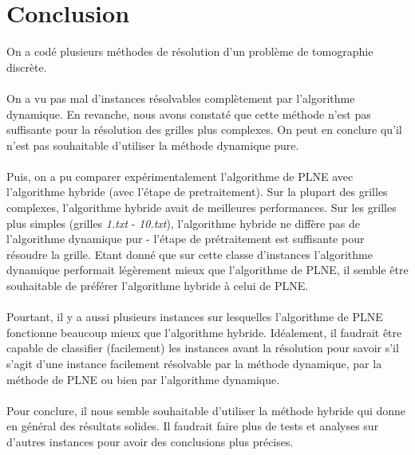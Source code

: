 \documentclass[10pt,a4paper]{article}
\begin{document}
\section*{Conclusion}
\noindent
On a codé plusieurs méthodes de résolution d'un problème de tomographie discrète. \\ \\
\noindent
On a vu pas mal d'instances résolvables complètement par l'algorithme dynamique. En revanche, nous avons constaté que cette méthode n'est pas suffisante pour la résolution des grilles plus complexes. On peut en conclure qu'il n'est pas souhaitable d'utiliser la méthode dynamique pure. \\ \\
\noindent
Puis, on a pu comparer expérimentalement l'algorithme de PLNE avec l'algorithme hybride (avec l'étape de pretraitement). Sur la plupart des grilles complexes, l'algorithme hybride avait de meilleures performances. Sur les grilles plus simples (grilles \textit{1.txt} - \textit{10.txt}), l'algorithme hybride ne diffère pas de l'algorithme dynamique pur - l'étape de prétraitement est suffisante pour résoudre la grille. Etant donné que sur cette classe d'instances l'algorithme dynamique performait légèrement mieux que l'algorithme de PLNE, il semble être souhaitable de préférer l'algorithme hybride à celui de PLNE. \\ \\
\noindent
Pourtant, il y a aussi plusieurs instances sur lesquelles l'algorithme de PLNE fonctionne beaucoup mieux que l'algorithme hybride. Idéalement, il faudrait être capable de classifier (facilement) les instances avant la résolution pour savoir s'il s'agit d'une instance facilement résolvable par la méthode dynamique, par la méthode de PLNE ou bien par l'algorithme dynamique. \\ \\
\noindent
Pour conclure, il nous semble souhaitable d'utiliser la méthode hybride qui donne en général des résultats solides. Il faudrait faire plus de tests et analyses sur d'autres instances pour avoir des conclusions plus précises. \\  
\noindent 
\newpage
\end{document}
